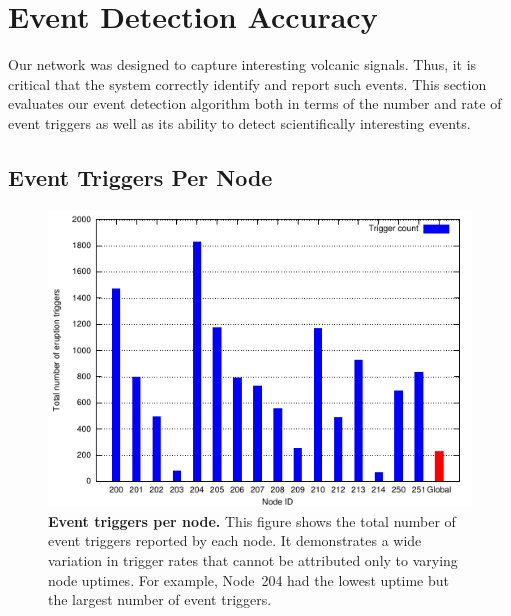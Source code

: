 \section{Event Detection Accuracy}
\label{evaluation-sec-eventdetection}

Our network was designed to capture interesting volcanic signals. Thus, it is
critical that the system correctly identify and report such events. This
section evaluates our event detection algorithm both in terms of the number
and rate of event triggers as well as its ability to detect scientifically
interesting events.

\subsection{Event Triggers Per Node}

\begin{figure}[t]
\begin{center}
\includegraphics[width=\hsize]{./3-evaluation/figs/eruptioncount.pdf}
\end{center}
\caption{\textbf{Event triggers per node.}
This figure shows the total number of event triggers reported by each node.
It demonstrates a wide variation in trigger rates that cannot be attributed
only to varying node uptimes. For example, Node~204 had the lowest uptime but
the largest number of event triggers.}
\label{evaluation-fig-eruptioncount}
\end{figure}

